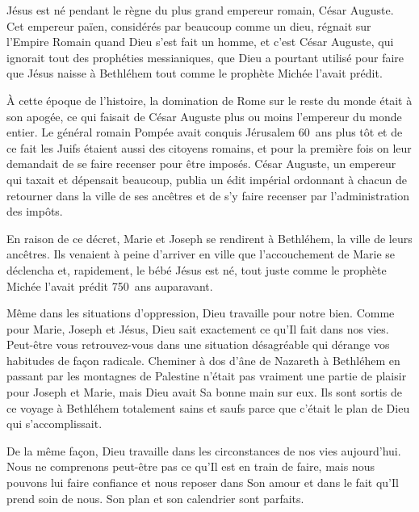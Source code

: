 

Jésus est né pendant le règne du plus grand empereur romain, César Auguste. Cet empereur païen, considérés par beaucoup comme un dieu, régnait sur l'Empire Romain quand Dieu s'est fait un homme, et c'est César Auguste, qui ignorait tout des prophéties messianiques, que Dieu a pourtant utilisé pour faire que Jésus naisse à Bethléhem tout comme le prophète Michée l'avait prédit.

À cette époque de l'histoire, la domination de Rome sur le reste du monde était à son apogée, ce qui faisait de César Auguste plus ou moins l'empereur du monde entier. Le général romain Pompée avait conquis Jérusalem 60~ans plus tôt et de ce fait les Juifs étaient aussi des citoyens romains, et pour la première fois on leur demandait de se faire recenser pour être imposés. César Auguste, un empereur qui taxait et dépensait beaucoup, publia un édit impérial ordonnant à chacun de retourner dans la ville de ses ancêtres et de s'y faire recenser par l'administration des impôts.

En raison de ce décret, Marie et Joseph se rendirent à Bethléhem, la ville de leurs ancêtres. Ils venaient à peine d'arriver en ville que l'accouchement de Marie se déclencha et, rapidement, le bébé Jésus est né, tout juste comme le prophète Michée l'avait prédit 750~ans auparavant.

Même dans les situations d'oppression, Dieu travaille pour notre bien. Comme pour Marie, Joseph et Jésus, Dieu sait exactement ce qu'Il fait dans nos vies. Peut-être vous retrouvez-vous dans une situation désagréable qui dérange vos habitudes de façon radicale. Cheminer à dos d'âne de Nazareth à Bethléhem en passant par les montagnes de Palestine n'était pas vraiment une partie de plaisir pour Joseph et Marie, mais Dieu avait Sa bonne main sur eux. Ils sont sortis de ce voyage à Bethléhem totalement sains et saufs parce que c'était le plan de Dieu qui s'accomplissait.

De la même façon, Dieu travaille dans les circonstances de nos vies aujourd'hui. Nous ne comprenons peut-être pas ce qu'Il est en train de faire, mais nous pouvons lui faire confiance et nous reposer dans Son amour et dans le fait qu'Il prend soin de nous. Son plan et son calendrier sont parfaits.


